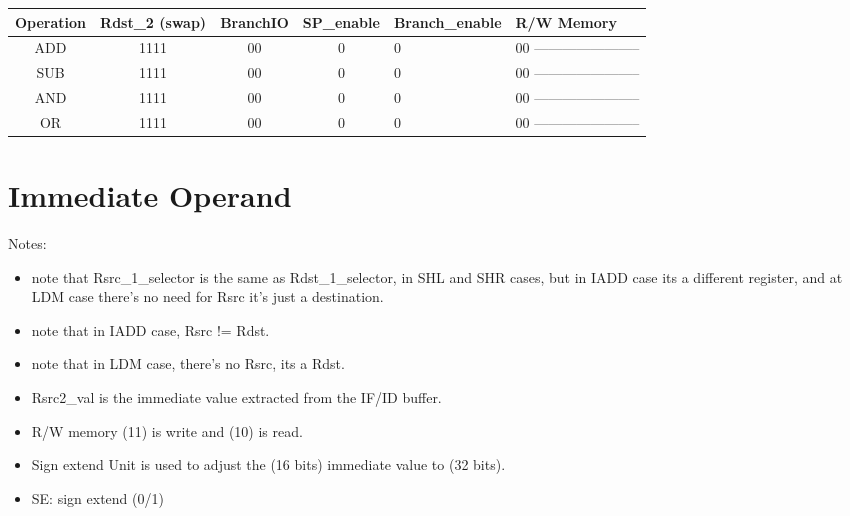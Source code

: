 \documentclass[12pt]{report}
\begin{document}
    \begin{center}
    \begin{tabular}{||c| c| c| c| p{40mm}||} 
    \hline
    Operation & Rdst_2 (swap) & BranchIO & SP_enable & Branch_enable & R/W Memory  \\ [0.5ex] 
    \hline\hline
    ADD & 1111 & 00 & 0 & 0 & 00 ----------------------- \\
    \hline
    SUB & 1111 & 00 & 0 & 0 & 00 ----------------------- \\
    \hline
    AND & 1111 & 00 & 0 & 0 & 00 ----------------------- \\
    \hline
    OR  & 1111 & 00 & 0 & 0 & 00 ----------------------- \\
    \hline

    \end{tabular}
    \end{center}


    \section{Immediate Operand}
    \item Notes:
    \begin{itemize}
        \item note that Rsrc_1_selector is the same as Rdst_1_selector, in SHL and SHR cases, but in IADD case its a different register, and at LDM case there's no need for Rsrc it's just a destination.
        \item note that in IADD case, Rsrc != Rdst.
        \item note that in LDM case, there's no Rsrc, its a Rdst.
        \item Rsrc2_val is the immediate value extracted from the IF/ID buffer.
        \item R/W memory (11) is write and (10) is read.
        \item Sign extend Unit is used to adjust the (16 bits) immediate value to (32 bits).
        \item SE: sign extend (0/1)
    \end{itemize}
\end{document}
